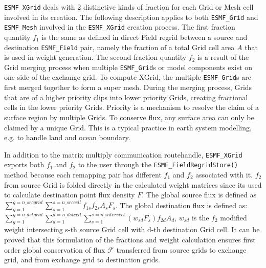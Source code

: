 {\tt ESMF\_XGrid} deals with 2 distinctive kinds of fraction for each Grid or Mesh cell
involved in its creation. The following description applies to both {\tt ESMF\_Grid} 
and {\tt ESMF\_Mesh} involved in the {\tt ESMF\_XGrid} creation process.
The first fraction quantity $f_1$ is the same as defined in direct
Field regrid between a source and destination {\tt ESMF\_Field} pair, namely the fraction
of a total Grid cell area $A$ that is used in weight generation. The second fraction quantity $f_2$
is a result of the Grid merging process when multiple {\tt ESMF\_Grid}s or model components
exist on one side of the exchange grid. To compute XGrid, the multiple {\tt ESMF\_Grid}s
are first merged together to form a super mesh. During the merging process, Grids that are
of a higher priority clips into lower priority Grids, creating fractional cells in the lower
priority Grids. Priority is a mechanism to resolve the claim of a surface region by multiple
Grids. To conserve flux, any surface area can only be claimed by a unique Grid. This is
a typical practice in earth system modelling, e.g. to handle land and ocean boundary.

In addition to the matrix multiply communication routehandle, 
{\tt ESMF\_XGrid} exports both $f_1$ and $f_2$ to the user through the {\tt ESMF\_FieldRegridStore()} method
because each remapping pair has different $f_1$ and $f_2$ associated with it. $f_2$ from source Grid is 
folded directly in the calculated weight matrices since its used to calculate destination point flux
density $F$. The global source flux is defined as $\sum_{g=1}^{g=n\_srcgrid}\sum_{s=1}^{s=n\_srccell}{ f_{1s} f_{2s} A_s F_s }$.
The global destination flux is defined as: 
$\sum_{g=1}^{g=n\_dstgrid}\sum_{d=1}^{d=n\_dstcell}{ \sum_{s=1}^{s=n\_intersect}(w_{sd} F_s) f_{2d} A_d}$, $w_{sd}$ is the
$f_2$ modified weight intersecting s-th source Grid cell with d-th destination Grid cell.
It can be proved that this formulation of the fractions and 
weight calculation ensures first order global conservation of
flux $\mathcal{F}$ transferred from source grids to exchange grid, and from exchange grid to destination grids.

